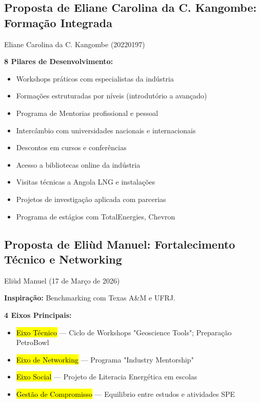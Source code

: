 \documentclass[12pt,a4paper,oneside]{article}
\begin{document}
\vspace{1.2cm}

\subsection{Proposta de Eliane Carolina da C. Kangombe: Formação Integrada}

\begin{proposalbox}{Eliane Carolina da C. Kangombe (20220197)}

\textbf{8 Pilares de Desenvolvimento:}

\begin{itemize}[label={\color{spe-secondary}▸}]
  \item Workshops práticos com especialistas da indústria
  \item Formações estruturadas por níveis (introdutório a avançado)
  \item Programa de Mentorias profissional e pessoal
  \item Intercâmbio com universidades nacionais e internacionais
  \item Descontos em cursos e conferências
  \item Acesso a bibliotecas online da indústria
  \item Visitas técnicas a Angola LNG e instalações
  \item Projetos de investigação aplicada com parcerias
  \item Programa de estágios com TotalEnergies, Chevron
\end{itemize}

\end{proposalbox}

\vspace{1.2cm}

\subsection{Proposta de Eliùd Manuel: Fortalecimento Técnico e Networking}

\begin{proposalbox}{Eliùd Manuel (17 de Março de 2026)}

\textbf{Inspiração:} Benchmarking com Texas A&M e UFRJ.

\medskip

\textbf{4 Eixos Principais:}

\begin{itemize}[label={\color{spe-secondary}▸}]
  \item \hl{Eixo Técnico} — Ciclo de Workshops "Geoscience Tools"; Preparação PetroBowl
  \item \hl{Eixo de Networking} — Programa "Industry Mentorship"
  \item \hl{Eixo Social} — Projeto de Literacia Energética em escolas
  \item \hl{Gestão de Compromisso} — Equilibrio entre estudos e atividades SPE
\end{itemize}

\end{proposalbox}
\end{document}
